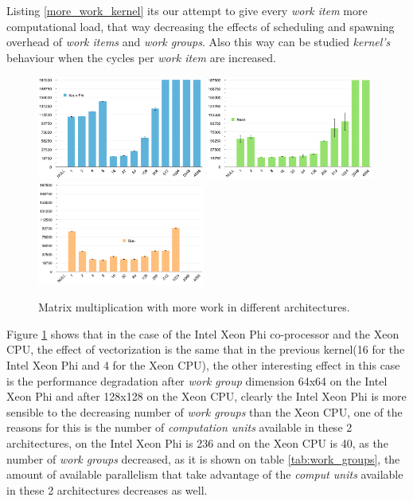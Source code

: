 \par{Listing \ref{more_work_kernel} its our attempt to give every \emph{work item} more computational load, that way decreasing the
    effects of scheduling and spawning overhead of \emph{work items} and \emph{work groups}. Also this way can be studied 
    \emph{kernel's} behaviour when the cycles per \emph{work item} are increased.}



\begin{figure}[!h]
    \centering
    \includegraphics[width=0.49\textwidth]{figures/opt1_phi.png}
    \includegraphics[width=0.49\textwidth]{figures/opt1_cpu.png}
    \includegraphics[width=0.49\textwidth]{figures/opt1_gpu.png}
    \caption{Matrix multiplication with more work in different architectures.}
    \label{MoreWork}
\end{figure}

\par{Figure \ref{MoreWork} shows that in the case of the Intel Xeon Phi co-processor and the Xeon CPU, the effect of vectorization
    is the same that in the previous kernel(16 for the Intel Xeon Phi and 4 for the Xeon CPU), the other interesting effect in this
    case is the performance degradation after \emph{work group} dimension 64x64 on the Intel Xeon Phi and after 128x128 on the Xeon
    CPU, clearly the Intel Xeon Phi is more sensible to the decreasing number of \emph{work groups} than the Xeon CPU, one of the 
    reasons for this is the number of \emph{computation units} available in these 2 architectures, on the Intel Xeon Phi is 236 and
    on the Xeon CPU is 40, as the number of \emph{work groups} decreased, as it is shown on table \ref{tab:work_groups}, the amount
    of available parallelism that take advantage of the \emph{comput units} available in these 2 architectures decreases as well.}


